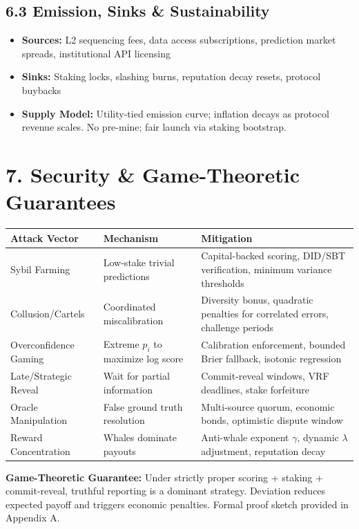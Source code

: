 \documentclass[11pt,a4paper]{article}
\begin{document}
\subsection*{6.3 Emission, Sinks \& Sustainability}
\begin{itemize}[leftmargin=*]
    \item \textbf{Sources:} L2 sequencing fees, data access subscriptions, prediction market spreads, institutional API licensing
    \item \textbf{Sinks:} Staking locks, slashing burns, reputation decay resets, protocol buybacks
    \item \textbf{Supply Model:} Utility-tied emission curve; inflation decays as protocol revenue scales. No pre-mine; fair launch via staking bootstrap.
\end{itemize}

\section*{7. Security \& Game-Theoretic Guarantees}
\begin{center}
\begin{tabularx}{\textwidth}{@{}lXX@{}}
\toprule
\textbf{Attack Vector} & \textbf{Mechanism} & \textbf{Mitigation} \\
\midrule
Sybil Farming & Low-stake trivial predictions & Capital-backed scoring, DID/SBT verification, minimum variance thresholds \\
Collusion/Cartels & Coordinated miscalibration & Diversity bonus, quadratic penalties for correlated errors, challenge periods \\
Overconfidence Gaming & Extreme $p_i$ to maximize log score & Calibration enforcement, bounded Brier fallback, isotonic regression \\
Late/Strategic Reveal & Wait for partial information & Commit-reveal windows, VRF deadlines, stake forfeiture \\
Oracle Manipulation & False ground truth resolution & Multi-source quorum, economic bonds, optimistic dispute window \\
Reward Concentration & Whales dominate payouts & Anti-whale exponent $\gamma$, dynamic $\lambda$ adjustment, reputation decay \\
\bottomrule
\end{tabularx}
\end{center}
\noindent \textbf{Game-Theoretic Guarantee:} Under strictly proper scoring + staking + commit-reveal, truthful reporting is a dominant strategy. Deviation reduces expected payoff and triggers economic penalties. Formal proof sketch provided in Appendix A.
\end{document}

